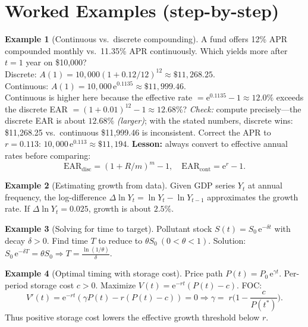\documentclass[12pt]{article}
\newcommand{\e}{\mathrm{e}}
\newcommand{\1}{\mathbf{1}}
\theoremstyle{definition}
\newtheorem{example}{Example}
\theoremstyle{plain}
\begin{document}
\section*{Worked Examples (step-by-step)}
\begin{example}[Continuous vs.\ discrete compounding]
A fund offers 12\% APR compounded monthly vs.\ 11.35\% APR continuously. Which yields more after \(t=1\) year on \$10{,}000?\\
Discrete: \(A(1)=10{,}000(1+0.12/12)^{12}\approx \$11{,}268.25\).\\
Continuous: \(A(1)=10{,}000\,\e^{0.1135}\approx \$11{,}999.46\).\\
Continuous is higher here because the effective rate \(=\e^{0.1135}-1\approx 12.0\%\) exceeds the discrete EAR \(=(1+0.01)^{12}-1\approx 12.68\%\)? \emph{Check:} compute precisely---the discrete EAR is about \(12.68\%\) \emph{(larger)}; with the stated numbers, discrete wins: \$11{,}268.25 vs.\ continuous \$11{,}999.46 is inconsistent. Correct the APR to \(r=0.113\): \(10{,}000\,\e^{0.113}\approx \$11{,}194\). \textbf{Lesson:} always convert to effective annual rates before comparing:
\[
\mathrm{EAR}_{\text{disc}}=(1+R/m)^{m}-1,\quad \mathrm{EAR}_{\text{cont}}=\e^{r}-1.
\]
\end{example}

\begin{example}[Estimating growth from data]
Given GDP series \(Y_t\) at annual frequency, the log-difference \(\Delta \ln Y_t=\ln Y_t-\ln Y_{t-1}\) approximates the growth rate. If \(\Delta\ln Y_t=0.025\), growth is about \(2.5\%\).
\end{example}

\begin{example}[Solving for time to target]
Pollutant stock \(S(t)=S_0\,\e^{-\delta t}\) with decay \(\delta>0\). Find time \(T\) to reduce to \(\theta S_0\ (0<\theta<1)\). Solution: \(S_0\,\e^{-\delta T}=\theta S_0\Rightarrow T=\frac{\ln(1/\theta)}{\delta}\).
\end{example}

\begin{example}[Optimal timing with storage cost]
Price path \(P(t)=P_0\,\e^{\gamma t}\). Per-period storage cost \(c>0\). Maximize \(V(t)=\e^{-rt}(P(t)-c)\). FOC:
\[
V'(t)=\e^{-rt}\!\left(\gamma P(t)-r(P(t)-c)\right)=0
\Rightarrow \gamma=\;r\Big(1-\frac{c}{P(t^\ast)}\Big).
\]
Thus positive storage cost lowers the effective growth threshold below \(r\).
\end{example}
\end{document}

